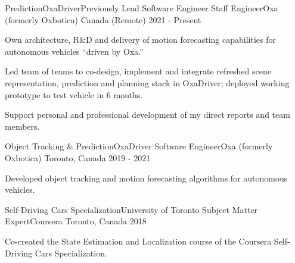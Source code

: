 

\begin{cventries}

  \cventry
    {Prediction{\awesomesep}OxaDriver{\awesomesep}Previously Lead Software Engineer} %
    {Staff Engineer{\awesomesep}Oxa (formerly Oxbotica)} %
    {Canada (Remote)} %
    {2021 - Present} %
    {
      \begin{cvitems} %
        \item {Own architecture, R\&D and delivery of motion forecasting capabilities for autonomous vehicles ``driven by Oxa.''}
        \item {Led team of teams to co-design, implement and integrate refreshed scene representation, prediction and planning stack in OxaDriver; deployed working prototype to test vehicle in 6 months.}
        \item {Support personal and professional development of my direct reports and team members.}
      \end{cvitems}
    }

  \cventry
    {Object Tracking \& Prediction{\awesomesep}OxaDriver} %
    {Software Engineer{\awesomesep}Oxa (formerly Oxbotica)} %
    {Toronto, Canada} %
    {2019 - 2021} %
    {
      \begin{cvitems} %
        \item {Developed object tracking and motion forecasting algorithms for autonomous vehicles.}
      \end{cvitems}
    }
  
  \cventry
    {Self-Driving Cars Specialization{\awesomesep}University of Toronto} %
    {Subject Matter Expert{\awesomesep}Coursera} %
    {Toronto, Canada} %
    {2018} %
    {
      \begin{cvitems} %
        \item {Co-created the State Estimation and Localization course of the Coursera Self-Driving Cars Specialization.}
      \end{cvitems}
    }
  

\end{cventries}
